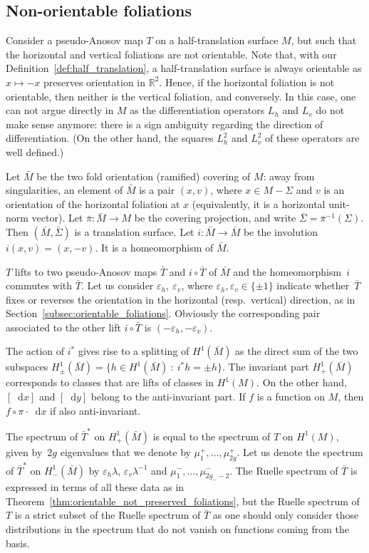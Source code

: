 \documentclass[10pt]{amsart}
\newcommand{\R}{\mathbb{R}}
\newcommand{\dd}{\mathop{}\!\mathrm{d}}
\newcommand{\st}{\::\:}
\let\epsilon\varepsilon
\theoremstyle{definition}
\numberwithin{equation}{section}
\begin{document}
\subsection{Non-orientable foliations}

Consider a pseudo-Anosov map $T$ on a half-translation surface $M$, but such
that the horizontal and vertical foliations are not orientable. Note that,
with our Definition~\ref{def:half_translation}, a half-translation surface is
always orientable as $x \mapsto -x$ preserves orientation in $\R^2$. Hence,
if the horizontal foliation is not orientable, then neither is the vertical
foliation, and conversely. In this case, one can not argue directly in $M$ as
the differentiation operators $L_h$ and $L_v$ do not make sense anymore:
there is a sign ambiguity regarding the direction of differentiation. (On the
other hand, the squares $L_h^2$ and $L_v^2$ of these operators are well
defined.)

Let $\bar M$ be the two fold orientation (ramified) covering of $M$: away
from singularities, an element of $\bar M$ is a pair $(x, v)$, where $x \in
M-\Sigma$ and $v$ is an orientation of the horizontal foliation at $x$
(equivalently, it is a horizontal unit-norm vector). Let $\bar \pi : \bar M
\to M$ be the covering projection, and write $\bar \Sigma = \bar
\pi^{-1}(\Sigma)$. Then $(\bar M, \bar \Sigma)$ is a translation surface.
Let $i: \bar M \to \bar M$ be the involution $i(x,v) = (x, -v)$. It is a
homeomorphism of $\bar M$.

$T$ lifts to two pseudo-Anosov maps $\bar T$ and $i\circ \bar T$ of $\bar M$ and
the homeomorphism~$i$ commutes with $\bar T$. Let us consider $\epsilon_h,\ \epsilon_v$, where $\epsilon_h, \epsilon_v \in \{\pm 1\}$ indicate whether~$\bar T$ fixes or reverses
the orientation in the horizontal (resp.\ vertical) direction, as in Section~\ref{subsec:orientable_foliations}.
Obviously the corresponding pair associated to the other lift $i\circ \bar T$ is $(-\epsilon_h,-\epsilon_v)$.

The action of $i^\ast$ gives rise to a splitting of $H^1(\bar M)$ as the
direct sum of the two subspaces $H^1_\pm(\bar M) = \{ h \in H^1(\bar M) \st
i^* h = \pm h\}$. The invariant part $H^1_+(\bar M)$ corresponds to classes
that are lifts of classes in $H^1(M)$. On the other hand, $[\dd x]$ and $[\dd
y]$ belong to the anti-invariant part. If $f$ is a function on $M$, then
$f\circ \pi \cdot \dd x$ if also anti-invariant.

The spectrum of $\bar T^*$ on $H^1_+(\bar M)$ is equal to the spectrum of $T$
on $H^1(M)$, given by~$2g$ eigenvalues that we denote by $\mu_1^+,\dotsc,
\mu_{2g}^+$. Let us denote the spectrum of $\bar T^*$ on $H^1_-(\bar M)$ by
$\epsilon_h \lambda$, $\epsilon_v \lambda^{-1}$ and $\mu_1^-,\dotsc,
\mu_{2g_- -2}^-$. The
Ruelle spectrum of $\bar T$ is expressed in terms of all these data as in
Theorem~\ref{thm:orientable_not_preserved_foliations}, but the Ruelle
spectrum of $T$ is a strict subset of the Ruelle spectrum of $\bar T$ as one
should only consider those distributions in the spectrum that do not vanish
on functions coming from the basis.
\end{document}
